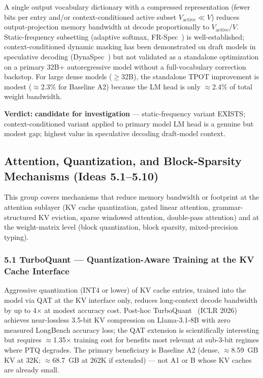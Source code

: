 \documentclass[11pt]{article}
\begin{document}
A single output vocabulary dictionary with a compressed representation (fewer bits per entry and/or context-conditioned active subset $V_{\text{active}} \ll V$) reduces output-projection memory bandwidth at decode proportionally to $V_{\text{active}}/V$.
Static-frequency subsetting (adaptive softmax, FR-Spec~\cite{Zhao2025FRSpec}) is well-established; context-conditioned dynamic masking has been demonstrated on draft models in speculative decoding (DynaSpec~\cite{Zhang2025DynaSpec}) but not validated as a standalone optimization on a primary 32B+ autoregressive model without a full-vocabulary correction backstop.
For large dense models ($\geq$32B), the standalone TPOT improvement is modest ($\approx$2.3\% for Baseline A2) because the LM head is only $\approx$2.4\% of total weight bandwidth.

\textbf{Verdict:} \textbf{candidate for investigation} --- static-frequency variant EXISTS; context-conditioned variant applied to primary model LM head is a genuine but modest gap; highest value in speculative decoding draft-model context.

\subsection{Attention, Quantization, and Block-Sparsity Mechanisms (Ideas 5.1--5.10)}
\label{sec:group5}

This group covers mechanisms that reduce memory bandwidth or footprint at the attention sublayer (KV cache quantization, gated linear attention, grammar-structured KV eviction, sparse windowed attention, double-pass attention) and at the weight-matrix level (block quantization, block sparsity, mixed-precision typing).

\subsubsection{5.1 TurboQuant --- Quantization-Aware Training at the KV Cache Interface}
\label{sec:idea_5_1}

Aggressive quantization (INT4 or lower) of KV cache entries, trained into the model via QAT at the KV interface only, reduces long-context decode bandwidth by up to 4$\times$ at modest accuracy cost.
Post-hoc TurboQuant~\cite{Zandieh2026TurboQuant} (ICLR 2026) achieves near-lossless 3.5-bit KV compression on Llama-3.1-8B with zero measured LongBench accuracy loss; the QAT extension is scientifically interesting but requires $\approx$1.35$\times$ training cost for benefits most relevant at sub-3-bit regimes where PTQ degrades.
The primary beneficiary is Baseline A2 (dense, $\approx$8.59~GB KV at 32K; $\approx$68.7~GB at 262K if extended) --- not A1 or B whose KV caches are already small.
\end{document}
